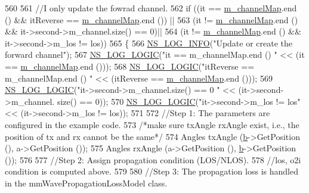 \begin{DoxyCode}
560 
561         \textcolor{comment}{//I only update the fowrad channel.}
562         \textcolor{keywordflow}{if} ((it == \hyperlink{classns3_1_1MmWave3gppChannel_a31f05f0c8a438b8ce89f29813e863040}{m\_channelMap}.end () && itReverse == \hyperlink{classns3_1_1MmWave3gppChannel_a31f05f0c8a438b8ce89f29813e863040}{m\_channelMap}.end ()) ||
563                         (it != \hyperlink{classns3_1_1MmWave3gppChannel_a31f05f0c8a438b8ce89f29813e863040}{m\_channelMap}.end () && it->second->m\_channel.size() == 0)||
564                         (it != \hyperlink{classns3_1_1MmWave3gppChannel_a31f05f0c8a438b8ce89f29813e863040}{m\_channelMap}.end () && it->second->m\_los != los))
565         \{
566                 \hyperlink{group__logging_gafbd73ee2cf9f26b319f49086d8e860fb}{NS\_LOG\_INFO}(\textcolor{stringliteral}{"Update or create the forward channel"});
567                 \hyperlink{group__logging_ga88acd260151caf2db9c0fc84997f45ce}{NS\_LOG\_LOGIC}(\textcolor{stringliteral}{"it == m\_channelMap.end () "} << (it == 
      \hyperlink{classns3_1_1MmWave3gppChannel_a31f05f0c8a438b8ce89f29813e863040}{m\_channelMap}.end ()));
568                 \hyperlink{group__logging_ga88acd260151caf2db9c0fc84997f45ce}{NS\_LOG\_LOGIC}(\textcolor{stringliteral}{"itReverse == m\_channelMap.end () "} << (itReverse == 
      \hyperlink{classns3_1_1MmWave3gppChannel_a31f05f0c8a438b8ce89f29813e863040}{m\_channelMap}.end ()));
569                 \hyperlink{group__logging_ga88acd260151caf2db9c0fc84997f45ce}{NS\_LOG\_LOGIC}(\textcolor{stringliteral}{"it->second->m\_channel.size() == 0 "} << (it->second->m\_channel.
      size() == 0));
570                 \hyperlink{group__logging_ga88acd260151caf2db9c0fc84997f45ce}{NS\_LOG\_LOGIC}(\textcolor{stringliteral}{"it->second->m\_los != los"} << (it->second->m\_los != los));
571                 
572                 \textcolor{comment}{//Step 1: The parameters are configured in the example code.}
573                 \textcolor{comment}{/*make sure txAngle rxAngle exist, i.e., the position of tx and rx cannot be the same*/}
574                 Angles txAngle (\hyperlink{buildings__pathloss_8m_a21ad0bd836b90d08f4cf640b4c298e7c}{b}->GetPosition (), a->GetPosition ());
575                 Angles rxAngle (a->GetPosition (), \hyperlink{buildings__pathloss_8m_a21ad0bd836b90d08f4cf640b4c298e7c}{b}->GetPosition ());
576 
577                 \textcolor{comment}{//Step 2: Assign propagation condition (LOS/NLOS).}
578                 \textcolor{comment}{//los, o2i condition is computed above.}
579 
580                 \textcolor{comment}{//Step 3: The propagation loss is handled in the mmWavePropagationLossModel class.}

\end{DoxyCode}
